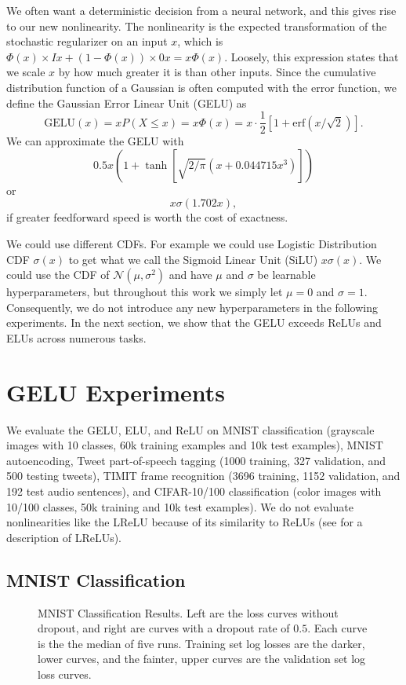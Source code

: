 \documentclass{article}
\begin{document}
We often want a deterministic decision from a neural network, and this gives rise to our new nonlinearity. The nonlinearity is the expected transformation of the stochastic regularizer on an input $x$, which is $\Phi(x)\times Ix + (1 - \Phi(x))\times 0x = x\Phi(x)$. Loosely, this expression states that we scale $x$ by how much greater it is than other inputs. Since the cumulative distribution function of a Gaussian is often computed with the error function, we define the Gaussian Error Linear Unit (GELU) as
\[
\text{GELU}(x) = xP(X\le x) = x\Phi(x) = x \cdot \frac{1}{2}\left[1 + \text{erf}(x/\sqrt{2})\right].
\]
We can approximate the GELU with
\[
0.5x (1 + \tanh[\sqrt{2/\pi}(x + 0.044715x^3)])
\]
or
\[
x \sigma(1.702 x),
\]
if greater feedforward speed is worth the cost of exactness.

We could use different CDFs. For example we could use Logistic Distribution CDF $\sigma(x)$ to get what we call the Sigmoid Linear Unit (SiLU) $x\sigma(x)$. We could use the CDF of $\mathcal{N}(\mu, \sigma^2)$ and have $\mu$ and $\sigma$ be learnable hyperparameters, but throughout this work we simply let $\mu = 0$ and $\sigma = 1$. Consequently, we do not introduce any new hyperparameters in the following experiments. In the next section, we show that the GELU  exceeds ReLUs and ELUs across numerous tasks.

\section{GELU Experiments}
We evaluate the GELU, ELU, and ReLU on MNIST classification (grayscale images with 10 classes, 60k training examples and 10k test examples), MNIST autoencoding, Tweet part-of-speech tagging (1000 training, 327 validation, and 500 testing tweets), TIMIT frame recognition (3696 training, 1152 validation, and 192 test audio sentences), and CIFAR-10/100 classification (color images with 10/100 classes, 50k training and 10k test examples). We do not evaluate nonlinearities like the LReLU because of its similarity to ReLUs (see \cite{lrelu} for a description of LReLUs).

\subsection{MNIST Classification}
\begin{figure}
	\centering
	\noindent{}
	\caption{MNIST Classification Results. Left are the loss curves without dropout, and right are curves with a dropout rate of $0.5$. Each curve is the the median of five runs. Training set log losses are the darker, lower curves, and the fainter, upper curves are the validation set log loss curves.}\label{fig:mnist1}
\end{figure}
\end{document}
